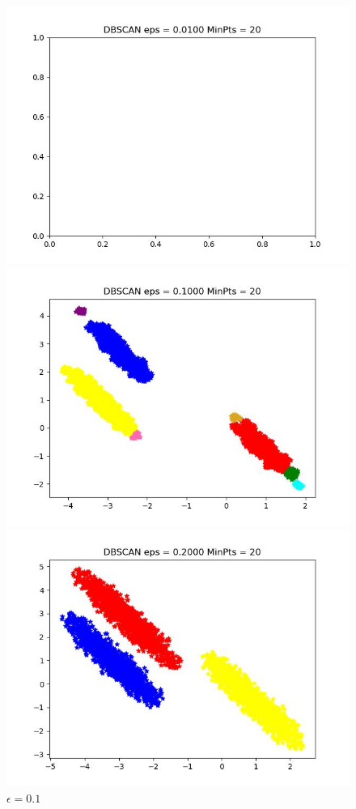 \documentclass[UTF8]{ctexart}
\begin{document}
\begin{figure}[H]
	\centering
	\begin{minipage}{0.32\linewidth}
		\centering
		\includegraphics[width=0.9\linewidth]{data3-0.01.jpg}
		\caption{$\epsilon=0.01$}
		\label{chutian1}%
	\end{minipage}
	\begin{minipage}{0.32\linewidth}
		\centering
		\includegraphics[width=0.9\linewidth]{data3-0.1.jpg}
		\caption{$\epsilon=0.1$}
		\label{chutian2}%
	\end{minipage}
  \begin{minipage}{0.32\linewidth}
		\centering
		\includegraphics[width=0.9\linewidth]{data3-0.2.jpg}

\end{minipage}
\end{figure}
\end{document}
